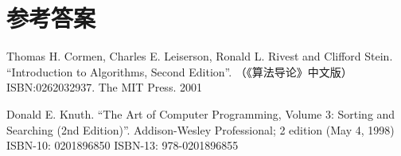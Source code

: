 \documentclass[b5paper]{ctexart}
\begin{document}
\section{参考答案}
\shipoutAnswer

\begin{thebibliography}{99}

Thomas H. Cormen, Charles E. Leiserson, Ronald L. Rivest and Clifford Stein.
``Introduction to Algorithms, Second Edition''. （《算法导论》中文版）ISBN:0262032937. The MIT Press. 2001

Donald E. Knuth. ``The Art of Computer Programming, Volume 3: Sorting and Searching (2nd Edition)''. Addison-Wesley Professional; 2 edition (May 4, 1998) ISBN-10: 0201896850 ISBN-13: 978-0201896855

\end{thebibliography}
\end{document}
